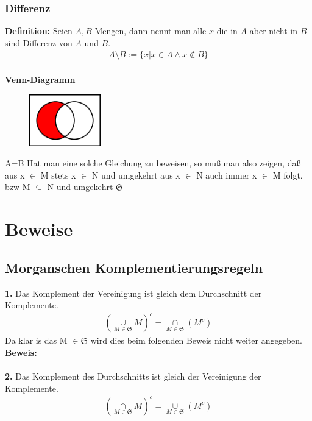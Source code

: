 \documentclass[../AbiMappe_Mathe.tex]{subfiles}
\begin{document}
\subsubsection{Differenz}
\textbf{Definition:} Seien $A,B$ Mengen, dann nennt man alle $x$ die in $A$ aber nicht in $B$ sind Differenz von $A$ und $B$.
\begin{align*}
A \setminus B:=\{x|x \in A \land x \notin B\}
\end{align*}
\\
\textbf{Venn-Diagramm}
\begin{figure}[H]
\centering
\includegraphics[width=117px, height=85.5px]{VennDiff.png}
\end{figure}

A=B
Hat man eine solche Gleichung zu beweisen, so muß man also zeigen, daß aus x $\in$ M stets x $\in$ N und umgekehrt aus x $\in$ N auch immer x $\in$ M folgt. bzw M $\subseteq$ N und umgekehrt
 $\mathfrak{S}$

 \section{Beweise}
 \subsection{Morganschen Komplementierungsregeln}
 \textbf{1. }Das Komplement der Vereinigung ist gleich dem Durchschnitt der Komplemente.\\
 \begin{align*}
	(\underset{M \in \mathfrak{S}}{\overset{}{\cup}}M)^c =  \underset{M \in \mathfrak{S}}{\overset{}{\cap}}(M^c)
 \end{align*}
 Da klar is das M $\in \mathfrak{S}$ wird dies beim folgenden Beweis nicht weiter angegeben.\\
\textbf{Beweis:}\\\\
\textbf{2. }Das Komplement des Durchschnitts ist gleich der Vereinigung der Komplemente.\\
 \begin{align*}
	(\underset{M \in \mathfrak{S}}{\overset{}{\cap}}M)^c =  \underset{M \in \mathfrak{S}}{\overset{}{\cup}}(M^c)
 \end{align*}
\end{document}
